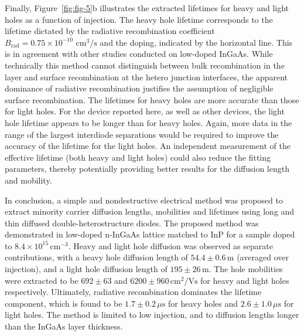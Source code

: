 \documentclass[aip,amsmath,amssymb,reprint]{revtex4-1}
\begin{document}
Finally, Figure~\ref{fig:fig-5}b illustrates the extracted lifetimes for heavy and light holes as a function of injection. The heavy hole lifetime corresponds to the lifetime dictated by the radiative recombination coefficient $B_{\text{rad}} = 0.75\times10^{-10} \text{ cm}^3/\text{s}$ and the doping, indicated by the horizontal line. This is in agreement with other studies conducted on low-doped InGaAs.\cite{Wichman,Zielinski,Wintner,Walkerb} While technically this method cannot distinguish between bulk recombination in the layer and surface recombination at the hetero junction interfaces, the apparent dominance of radiative recombination justifies the assumption of negligible surface recombination. The lifetimes for heavy holes are more accurate than those for light holes. For the device reported here, as well as other devices, the light hole lifetime appears to be longer than for heavy holes. Again, more data in the range of the largest interdiode separations would be required to improve the accuracy of the lifetime for the light holes. An independent measurement of the effective lifetime (both heavy and light holes) could also reduce the fitting parameters, thereby potentially providing better results for the diffusion length and mobility.

In conclusion, a simple and nondestructive electrical method was proposed to extract minority carrier diffusion lengths, mobilities and lifetimes using long and thin diffused double-heterostructure diodes.
 The proposed method was demonstrated in low-doped n-InGaAs lattice matched to InP for a sample doped to $8.4\times 10^{15}\, \text{cm}^{-3}$.
 Heavy and light hole diffusion was observed as separate contributions, with a heavy hole diffusion length of $54.4\pm0.6\,$\textmu m (averaged over injection), and a light hole diffusion length of $195\pm26\,$\textmu m.
 The hole mobilities were extracted to be $692\pm63$ and $6200\pm960\, \text{cm}^{2}\text{/Vs}$ for heavy and light holes respectively. Ultimately, radiative recombination dominates the lifetime component, which is found to be $1.7\pm0.2\, \mu\text{s}$ for heavy holes and $2.6\pm1.0\, \mu\text{s}$ for light holes. The method is limited to low injection, and to diffusion lengths longer than the InGaAs layer thickness. 
\end{document}
